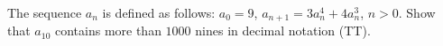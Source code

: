 The sequence $a_n$ is defined as follows: $a_0 = 9$, $a_{n+1} = 3a_n^4 + 4a_n^3$, $n > 0$. Show that $a_{10}$ contains more than $1000$ nines in decimal notation (TT).
